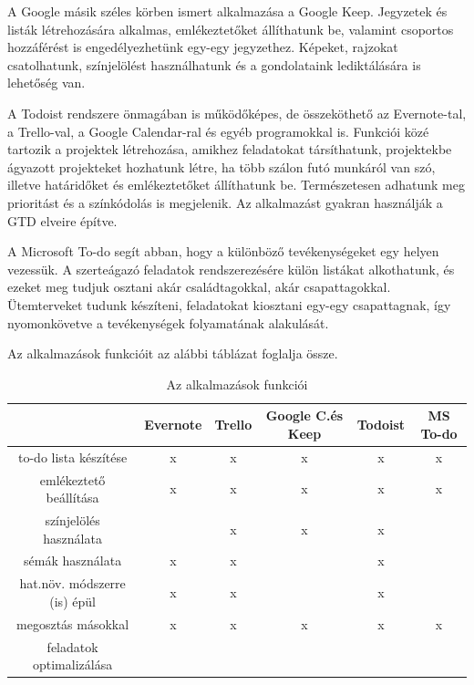 A Google másik széles körben ismert alkalmazása a Google Keep. Jegyzetek és listák létrehozására alkalmas, emlékeztetőket állíthatunk be, valamint csoportos hozzáférést is engedélyezhetünk egy-egy jegyzethez. Képeket, rajzokat csatolhatunk, színjelölést használhatunk és a gondolataink lediktálására is lehetőség van.


A Todoist rendszere önmagában is működőképes, de összeköthető az Evernote-tal, a Trello-val, a Google Calendar-ral és egyéb programokkal is. Funkciói közé tartozik a projektek létrehozása, amikhez feladatokat társíthatunk, projektekbe ágyazott projekteket hozhatunk létre, ha több szálon futó munkáról van szó, illetve határidőket és emlékeztetőket állíthatunk be. Természetesen adhatunk meg prioritást és a színkódolás is megjelenik. Az alkalmazást gyakran használják a GTD elveire építve.\cite{todoist}

A Microsoft To-do segít abban, hogy a különböző tevékenységeket egy helyen vezessük. A szerteágazó feladatok rendszerezésére külön listákat alkothatunk, és ezeket meg tudjuk osztani akár családtagokkal, akár csapattagokkal. Ütemterveket tudunk készíteni, feladatokat kiosztani egy-egy csapattagnak, így nyomonkövetve a tevékenységek folyamatának alakulását.\cite{todo}

Az alkalmazások funkcióit az alábbi táblázat foglalja össze.

\begin{table}[h]
	\centering
	\caption{Az alkalmazások funkciói}
	\label{tab:minta}
	\tabcolsep=0.1cm
	\begin{tabular}{|c|c|c|c|c|c|}
		\hline
		 & Evernote & Trello & Google C.és Keep & Todoist & MS To-do \\
		\hline
		to-do lista készítése & x & x & x & x & x \\
		\hline
		emlékeztető beállítása &x & x & x & x & x \\
		\hline
		színjelölés használata &  & x & x & x &   \\
		\hline
		sémák használata & x & x &   & x &   \\
		\hline
		hat.növ. módszerre (is) épül & x & x &   & x &   \\
		\hline
		megosztás másokkal & x & x & x & x & x \\
		\hline
		feladatok optimalizálása &  &   &   &   &   \\
		\hline
	\end{tabular}
\end{table}

